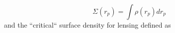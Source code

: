\begin{equation}
\Sigma(r_p) = \int \rho(r_p) dr_p
\end{equation}
and the ``critical`` surface density for lensing defined as
  